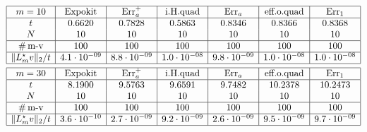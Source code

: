 \documentclass[smallextended]{svjour3pre}%
\numberwithin{equation}{section}
\numberwithin{figure}{section}
\numberwithin{table}{section}
\newcommand\Era{\mathrm{Err}_a}
\newcommand\Erone{\mathrm{Err}_1}
\begin{document}
\begin{remark}
\begin{table}
\centering
\caption{
All variants shown use exactly $m$ matrix-vector multiplications.
Whereas Expokit, improved Hermite quadrature (i.H.quad) and $\Era^+$ imply higher cost for the error estimate,
the other codes $\Era$, effective order quadrature (eff.o.quad) and $\Erone$ use standard Krylov subspaces and do not spend additional matrix-vector multiplications on error estimates.
}
\label{Table:ExpensivErrEstvsCheapErrEst}
\begin{equation*}
\begin{aligned}
\begin{array}{|c|c|c|c|c|c|c|}\hline
m=10& \text{Expokit}
& \Era^+
& \text{i.H.quad}
& \Era
& \text{eff.o.quad}
& \Erone
\\\hline
t
&0.6620&0.7828&0.5863&0.8346&0.8366&0.8368 \\
N
& 10 & 10 & 10 & 10 & 10 & 10  \\\hline
\text{\#\,m-v}
& 100 & 100 & 100 & 100 & 100 & 100 \\\hline
\|L_m^{\star} v\|_2/t
& 4.1\cdot 10^{-09} & 8.8\cdot 10^{-09} & 1.0\cdot 10^{-08} & 9.8\cdot 10^{-09} & 1.0\cdot 10^{-08} & 1.0\cdot 10^{-08} \\\hline
\end{array}
\\
\begin{array}{|c|c|c|c|c|c|c|}\hline
m=30& \text{Expokit}
& \Era^+
& \text{i.H.quad}
& \Era
& \text{eff.o.quad}
& \Erone
\\\hline
t
&  8.1900  &  9.5763  &  9.6591  &  9.7482  & 10.2378  & 10.2473 \\
N
& 10 & 10 & 10 & 10 & 10 & 10  \\\hline
\text{\#\,m-v}
& 100 & 100 & 100 & 100 & 100 & 100 \\\hline
\|L_m^{\star} v\|_2/t
& 3.6\cdot 10^{-10} & 2.7\cdot 10^{-09} & 9.2\cdot 10^{-09} & 2.6\cdot 10^{-09} & 9.5\cdot 10^{-09} & 9.7\cdot 10^{-09} \\\hline
\end{array}
\end{aligned}
\end{equation*}
\end{table}
\end{remark}
\end{document}

